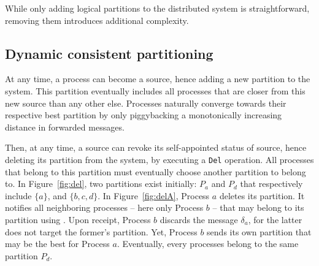 While only adding logical partitions to the distributed system is
straightforward, removing them introduces additional complexity.

\subsection{Dynamic consistent partitioning}

At any time, a process can become a source, hence adding a new
partition to the system. This partition eventually includes all
processes that are closer from this new source than any other
else. Processes naturally converge towards their respective best
partition by only piggybacking a monotonically increasing distance in
forwarded messages.

Then, at any time, a source can revoke its self-appointed status of
source, hence deleting its partition from the system, by executing a
\texttt{Del} operation. All processes that belong to this partition
must eventually choose another partition to belong to. In
Figure~\ref{fig:del}, two partitions exist initially: $P_a$ and $P_d$
that respectively include $\{a\}$, and $\{b, c, d\}$. In
Figure~\ref{fig:delA}, Process $a$ deletes its partition. It notifies
all neighboring processes -- here only Process $b$ -- that may belong
to its partition using \NAMEB. Upon receipt, Process $b$ discards the
message $\delta_a$, for the latter does not target the former's
partition. Yet, Process $b$ sends its own partition that may be the
best for Process $a$. Eventually, every processes belong to the same
partition $P_d$.



